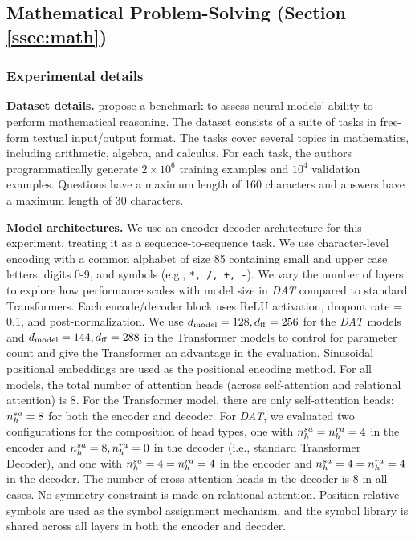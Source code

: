 \subsection{Mathematical Problem-Solving (Section \ref{ssec:math})}\label{ssec:appendix_math}

\subsubsection*{Experimental details}

\textbf{Dataset details.} \citet{saxtonAnalyzingMathematicalReasoning2019} propose a benchmark to assess neural models' ability to perform mathematical reasoning. The dataset consists of a suite of tasks in free-form textual input/output format. The tasks cover several topics in mathematics, including arithmetic, algebra, and calculus. For each task, the authors programmatically generate $2 \times 10^6$ training examples and $10^4$ validation examples. Questions have a maximum length of 160 characters and answers have a maximum length of 30 characters.


\textbf{Model architectures.} We use an encoder-decoder architecture for this experiment, treating it as a sequence-to-sequence task. We use character-level encoding with a common alphabet of size 85 containing small and upper case letters, digits 0-9, and symbols (e.g., \texttt{*, /, +, -}). We vary the number of layers to explore how performance scales with model size in \textit{DAT} compared to standard Transformers. Each encode/decoder block uses ReLU activation, dropout rate = 0.1, and post-normalization. We use $d_{\mathrm{model}} = 128, d_{\mathrm{ff}} = 256$ for the \textit{DAT} models and $d_{\mathrm{model}} = 144, d_{\mathrm{ff}} = 288$ in the Transformer models to control for parameter count and give the Transformer an advantage in the evaluation. Sinusoidal positional embeddings are used as the positional encoding method. For all models, the total number of attention heads (across self-attention and relational attention) is $8$. For the Transformer model, there are only self-attention heads: $n_h^{sa} = 8$ for both the encoder and decoder. For \textit{DAT}, we evaluated two configurations for the composition of head types, one with $n_h^{sa} = n_h^{ra} = 4$ in the encoder and $n_h^{sa} = 8, n_h^{ra} = 0$ in the decoder (i.e., standard Transformer Decoder), and one with $n_h^{sa} = 4 = n_h^{ra} = 4$ in the encoder and $n_h^{sa} = 4 = n_h^{ra} = 4$ in the decoder. The number of cross-attention heads in the decoder is $8$ in all cases. No symmetry constraint is made on relational attention. Position-relative symbols are used as the symbol assignment mechanism, and the symbol library is shared across all layers in both the encoder and decoder.

